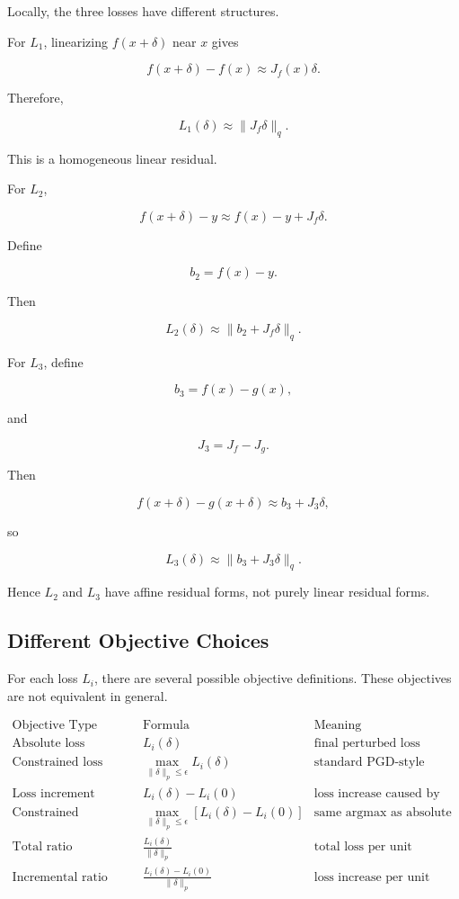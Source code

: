 \documentclass{article}
\begin{document}
Locally, the three losses have different structures.

For \(L_1\), linearizing \(f(x+\delta)\) near \(x\) gives

\[
f(x+\delta)-f(x)
\approx
J_f(x)\delta.
\]

Therefore,

\[
L_1(\delta)
\approx
\|J_f\delta\|_q.
\]

This is a homogeneous linear residual.

For \(L_2\),

\[
f(x+\delta)-y
\approx
f(x)-y+J_f\delta.
\]

Define

\[
b_2=f(x)-y.
\]

Then

\[
L_2(\delta)
\approx
\|b_2+J_f\delta\|_q.
\]

For \(L_3\), define

\[
b_3=f(x)-g(x),
\]

and

\[
J_3=J_f-J_g.
\]

Then

\[
f(x+\delta)-g(x+\delta)
\approx
b_3+J_3\delta,
\]

so

\[
L_3(\delta)
\approx
\|b_3+J_3\delta\|_q.
\]

Hence \(L_2\) and \(L_3\) have affine residual forms, not purely linear residual forms.

\subsection{Different Objective Choices}

For each loss \(L_i\), there are several possible objective definitions. These objectives are not equivalent in general.

\[
\begin{array}{c|c|c}
\text{Objective Type} & \text{Formula} & \text{Meaning} \\
\hline
\text{Absolute loss} 
&
L_i(\delta)
&
\text{final perturbed loss}
\\
\text{Constrained loss maximization}
&
\max_{\|\delta\|_p\le \epsilon} L_i(\delta)
&
\text{standard PGD-style attack objective}
\\
\text{Loss increment}
&
L_i(\delta)-L_i(0)
&
\text{loss increase caused by perturbation}
\\
\text{Constrained increment maximization}
&
\max_{\|\delta\|_p\le \epsilon}
\left[L_i(\delta)-L_i(0)\right]
&
\text{same argmax as absolute loss under fixed budget}
\\
\text{Total ratio}
&
\frac{L_i(\delta)}{\|\delta\|_p}
&
\text{total loss per unit perturbation}
\\
\text{Incremental ratio}
&
\frac{L_i(\delta)-L_i(0)}{\|\delta\|_p}
&
\text{loss increase per unit perturbation}
\end{array}
\]
\end{document}
